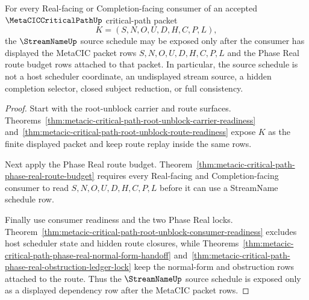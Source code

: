 \begin{theorem}
\label{thm:metacic-critical-path-real-streamname-source-readiness}
For every Real-facing or Completion-facing consumer of an accepted $\MetaCICCriticalPathUp$ critical-path packet
$$
K=(S,N,O,U,D,H,C,P,L),
$$
the $\StreamNameUp$ source schedule may be exposed only after the consumer has displayed the MetaCIC packet rows $S,N,O,U,D,H,C,P,L$ and the Phase Real route budget rows attached to that packet. In particular, the source schedule is not a host scheduler coordinate, an undisplayed stream source, a hidden completion selector, closed subject reduction, or full consistency.
\end{theorem}
\begin{proof}
Start with the root-unblock carrier and route surfaces. Theorems~\ref{thm:metacic-critical-path-root-unblock-carrier-readiness} and~\ref{thm:metacic-critical-path-root-unblock-route-readiness} expose $K$ as the finite displayed packet and keep route replay inside the same rows.

Next apply the Phase Real route budget. Theorem~\ref{thm:metacic-critical-path-phase-real-route-budget} requires every Real-facing and Completion-facing consumer to read $S,N,O,U,D,H,C,P,L$ before it can use a StreamName schedule row.

Finally use consumer readiness and the two Phase Real locks. Theorem~\ref{thm:metacic-critical-path-root-unblock-consumer-readiness} excludes host scheduler state and hidden route closures, while Theorems~\ref{thm:metacic-critical-path-phase-real-normal-form-handoff} and~\ref{thm:metacic-critical-path-phase-real-obstruction-ledger-lock} keep the normal-form and obstruction rows attached to the route. Thus the $\StreamNameUp$ source schedule is exposed only as a displayed dependency row after the MetaCIC packet rows.
\end{proof}

